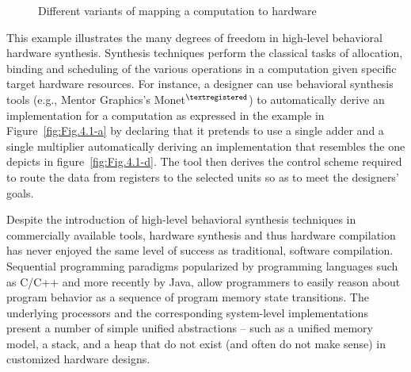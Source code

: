 \begin{figure}[htbp]
  \centering
  
  
\caption{Different variants of mapping a computation to hardware} 
\label{fig:Fig.4.1}
\end{figure}

This example illustrates the many degrees of freedom in high-level behavioral hardware synthesis. 
Synthesis techniques perform the classical tasks of allocation, binding and scheduling of the various operations in a computation given specific target hardware resources. 
For instance, a designer can use behavioral synthesis tools (e.g., Mentor Graphics's Monet$^{\textregistered}$) to automatically derive an implementation for a computation as expressed in the example in Figure~\ref{fig:Fig.4.1-a} by declaring that it pretends to use a single adder and a single multiplier automatically deriving an implementation that resembles the one depicts in figure~\ref{fig:Fig.4.1-d}. 
The tool then derives the control scheme required to route the data from registers to the selected units so as to meet the designers' goals. 

Despite the introduction of high-level behavioral synthesis techniques in commercially available tools, hardware synthesis and thus hardware compilation has never enjoyed the same level of success as traditional, software compilation. 
Sequential programming paradigms popularized by programming languages such as C/C++ and more recently by Java, allow programmers to easily reason about program behavior as a sequence of program memory state transitions. 
The underlying processors and the corresponding system-level implementations present a number of simple unified abstractions -- such as a unified memory model, a stack, and a heap that do not exist (and often do not make sense) in customized hardware designs.

